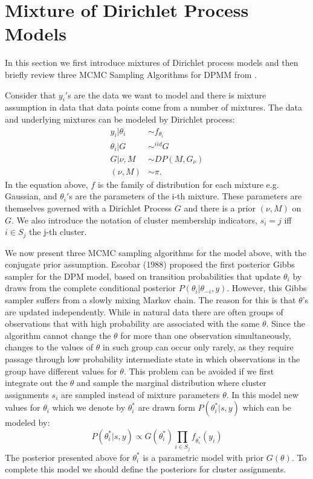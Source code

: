 \documentclass{article}
\begin{document}
\section{Mixture of Dirichlet Process Models}
In this section we first introduce mixtures of Dirichlet process models and then  briefly review three MCMC Sampling Algorithms for DPMM from \cite{neal}.

Consider that $y_i'$s are the data we want to model and there is mixture assumption in data that data points come from a number of mixtures. The
 data and underlying mixtures can be modeled by Dirichlet process:
 \begin{align*}
   y_i | \theta_i &\sim f_{\theta_i} \\
   \theta_i | G &\sim^{iid} G \\
   G | \nu, M &\sim DP(M, G_\nu)\\
   (\nu, M) &\sim \pi.
 \end{align*}
In the equation above, $f$ is the family of distribution for each mixture e.g. Gaussian, and $\theta_i'$s are the parameters of
the i-th mixture. These parameters are themselves governed with a Dirichlet Process $G$ and there is a prior $(\nu, M)$ on $G$.
We also introduce the notation of cluster membership indicators, $s_i=j$ iff $i \in S_j$ the j-th cluster.

We now present three MCMC sampling algorithms for the model above, with the conjugate prior assumption. Escobar (1988) proposed the first posterior Gibbs sampler for the DPM model,
based on transition probabilities that update $ \theta_i$ by draws from the complete
conditional posterior $P(\theta_i | \theta_{-i}, y)$. However, this Gibbs sampler suffers from a slowly mixing Markov chain. The reason for this
is that $\theta$'s are updated independently. While in natural data  there are often groups of observations that with high probability are associated with the same
$\theta$. Since the algorithm cannot change the $\theta$ for more than
one observation simultaneously, changes to the values of $\theta$ in such
group can occur only rarely, as they require passage through low probability
intermediate state in which observations in the group have different
values for $\theta$. This problem can be avoided if we first integrate
out the $\theta$ and sample the marginal distribution where cluster assignments $s_i$ are
sampled instead of mixture parameters $\theta$. In this model
new values for $\theta_i$ which we denote by $\theta_i^*$ are drawn form $P(\theta_i^* | s,y)$ which can be modeled by:
\begin{equation}
  P(\theta_i^* | s,y) \propto G(\theta_i^* ) \prod_{i \in S_j} f_{\theta_i^* }(y_i)
\end{equation}
The posterior presented above for $\theta_i^* $ is a parametric model with prior $G(\theta)$.
To complete this model we should define the posteriors for cluster assignments.
\end{document}
